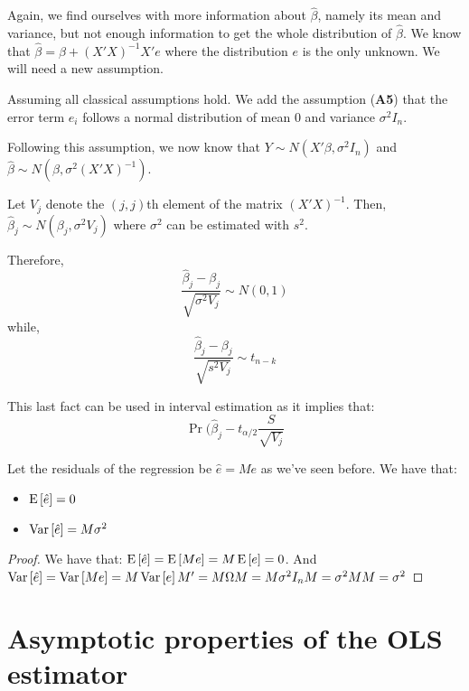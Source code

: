 Again, we find ourselves with more information about $\hat{\beta}$, namely its mean and variance, but not enough information to get the whole distribution of $\hat{\beta}$. We know that $\hat{\beta} = \beta + (X'X)^{-1}X'e$ where the distribution $e$ is the only unknown. We will need a new assumption.
\begin{definition}
Assuming all classical assumptions hold. We add the assumption (\textbf{A5}) that the error term $e_i$ follows a normal distribution of mean $0$ and variance $\sigma^2I_n$.

Following this assumption, we now know that $Y\sim N(X'\beta, \sigma^2 I_n)$ and $\hat{\beta}\sim N(\beta,\sigma^2(X'X)^{-1})$.
\end{definition}

\begin{proposition}
Let $V_j$ denote the $(j,j)$th element of the matrix $(X'X)^{-1}$. Then, $\hat{\beta}_j\sim N(\beta_j, \sigma^2V_j)$ where $\sigma^2$ can be estimated with $s^2$.

Therefore, $$\frac{\hat{\beta}_j -\beta_j}{\sqrt{\sigma^2V_j}}\sim N(0,1)$$ while, $$\frac{\hat{\beta}_j -\beta_j}{\sqrt{s^2V_j}}\sim t_{n-k}$$
\end{proposition}

\begin{definition}
This last fact can be used in interval estimation as it implies that: $$\operatorname{Pr}(\hat{\beta}_j - t_{\alpha /2}\frac{S}{\sqrt{V_j}} $$
\end{definition}

\begin{proposition}
Let the residuals of the regression be $\hat{e} = Me$ as we've seen before. We have that:\begin{itemize}
\item $\operatorname{E}\left[\hat{e}\right] = 0$
\item $\operatorname{Var}\left[\hat{e}\right] = M\sigma^2$
\end{itemize}
\end{proposition}
\begin{proof}
We have that: $\operatorname{E}\left[\hat{e}\right] = \operatorname{E}\left[Me\right] = M\operatorname{E}\left[e\right] = 0$. And $\operatorname{Var}\left[\hat{e}\right] = \operatorname{Var}\left[Me\right] = M\operatorname{Var}\left[e\right]M' = M\Omega M = M\sigma^2I_nM = \sigma^2MM = \sigma^2$
\end{proof}


\section{Asymptotic properties of the OLS estimator}

